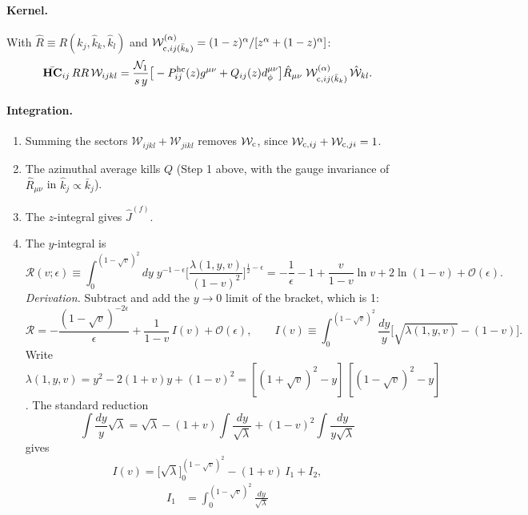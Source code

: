 \documentclass[11pt,a4paper]{article}
\newcommand{\bbHC}[1]{\bar{\mathbf{HC}}_{#1}}
\newcommand{\RR}{RR}
\newcommand{\W}[1]{\mathcal W_{#1}}
\newcommand{\jb}{\bar k_{j}}
\newcommand{\kb}{\bar k_{k}}
\newcommand{\jh}{\hat k_{j}}
\newcommand{\kh}{\hat k_{k}}
\newcommand{\lh}{\hat k_{l}}
\newcommand{\eps}{\epsilon}
\begin{document}
\paragraph{Kernel.} With $\hat R\equiv R(\jh,\kh,\lh)$ and $\W{{\rm c},ij(\kb)}^{(\alpha)}=(1-z)^\alpha/[z^\alpha+(1-z)^\alpha]$:
\begin{equation}
\bbHC{ij}\,\RR\,\W{ijkl}=\frac{\mathcal N_1}{s\,y}\big[-P^{\rm hc}_{ij}(z)g^{\mu\nu}+Q_{ij}(z)d^{\mu\nu}_\phi\big]\hat R_{\mu\nu}\;
\W{{\rm c},ij(\kb)}^{(\alpha)}\,\hat{\mathcal W}_{kl}.
\end{equation}

\paragraph{Integration.}
\begin{enumerate}
\item Summing the sectors $\W{ijkl}+\W{jikl}$ removes $\W{{\rm c}}$, since $\W{{\rm c},ij}+\W{{\rm c},ji}=1$.
\item The azimuthal average kills $Q$ (Step 1 above, with the gauge invariance of $\hat R_{\mu\nu}$ in $\jh\propto\jb$).
\item The $z$-integral gives $\hat J^{(f)}$.
\item The $y$-integral is
\begin{equation}
\mathcal R(v;\eps)\equiv\int_0^{(1-\sqrt v)^2}\!\!dy\;y^{-1-\eps}\Big[\frac{\lambda(1,y,v)}{(1-v)^2}\Big]^{\frac12-\eps}
=-\frac1\eps-1+\frac{v}{1-v}\ln v+2\ln(1-v)+\mathcal O(\eps).
\label{eq:Rv}
\end{equation}
\textit{Derivation.} Subtract and add the $y\to0$ limit of the bracket, which is 1:
\begin{equation}
\mathcal R=-\frac{(1-\sqrt v)^{-2\eps}}{\eps}+\frac{1}{1-v}\,I(v)+\mathcal O(\eps),\qquad
I(v)\equiv\int_0^{(1-\sqrt v)^2}\frac{dy}{y}\Big[\sqrt{\lambda(1,y,v)}-(1-v)\Big].
\end{equation}
Write $\lambda(1,y,v)=y^2-2(1+v)y+(1-v)^2=[(1+\sqrt v)^2-y]\,[(1-\sqrt v)^2-y]$. The standard reduction
\begin{equation}
\int\frac{dy}{y}\sqrt\lambda=\sqrt\lambda-(1+v)\int\frac{dy}{\sqrt\lambda}+(1-v)^2\int\frac{dy}{y\sqrt\lambda}
\end{equation}
gives
\begin{equation}
I(v)=\Big[\sqrt\lambda\Big]_0^{(1-\sqrt v)^2}-(1+v)\,I_1+I_2,
\end{equation}
\begin{align}
I_1&=\int_0^{(1-\sqrt v)^2}\frac{dy}{\sqrt\lambda}

\end{align}
\end{enumerate}
\end{document}
